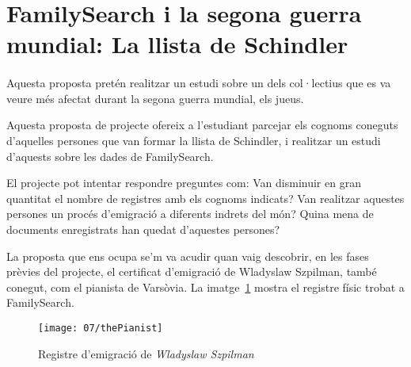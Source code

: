 \section{FamilySearch i la segona guerra mundial: La llista de Schindler}

    \paragraph{}
    Aquesta proposta pretén realitzar un estudi sobre un dels col·lectius que es va veure més afectat durant la segona guerra mundial, els jueus.

    Aquesta proposta de projecte ofereix a l'estudiant parcejar els cognoms coneguts d'aquelles persones que van formar la llista de Schindler, i realitzar un estudi d'aquests sobre les dades de FamilySearch.

    El projecte pot intentar respondre preguntes com: Van disminuir en gran quantitat el nombre de registres amb els cognoms indicats? Van realitzar aquestes persones un procés d'emigració a diferents indrets del món? Quina mena de documents enregistrats han quedat d'aquestes persones?

    La proposta que ens ocupa se'm va acudir quan vaig descobrir, en les fases prèvies del projecte, el certificat d'emigració de Wladyslaw Szpilman, també conegut, com el pianista de Varsòvia. La imatge~\ref{fig:thePianist} mostra el registre físic trobat a FamilySearch.

    \begin{figure}[h]
        \texttt{[image: 07/thePianist]}
        \centering
        \caption{Registre d'emigració de \emph{Wladyslaw Szpilman}\label{fig:thePianist}}
    \end{figure}
